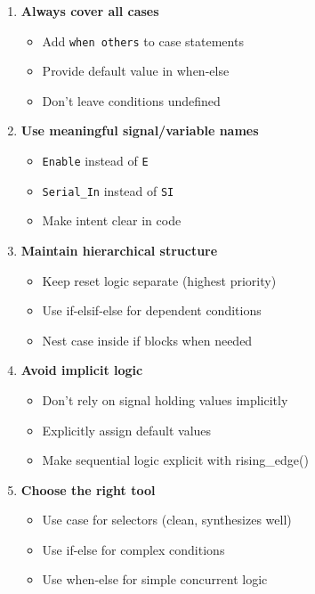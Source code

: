 \documentclass[12pt,a4paper]{article}
\begin{document}
\begin{enumerate}
    \item \textbf{Always cover all cases}
        \begin{itemize}
            \item Add \texttt{when others} to case statements
            \item Provide default value in when-else
            \item Don't leave conditions undefined
        \end{itemize}
    
    \item \textbf{Use meaningful signal/variable names}
        \begin{itemize}
            \item \texttt{Enable} instead of \texttt{E}
            \item \texttt{Serial\_In} instead of \texttt{SI}
            \item Make intent clear in code
        \end{itemize}
    
    \item \textbf{Maintain hierarchical structure}
        \begin{itemize}
            \item Keep reset logic separate (highest priority)
            \item Use if-elsif-else for dependent conditions
            \item Nest case inside if blocks when needed
        \end{itemize}
    
    \item \textbf{Avoid implicit logic}
        \begin{itemize}
            \item Don't rely on signal holding values implicitly
            \item Explicitly assign default values
            \item Make sequential logic explicit with rising\_edge()
        \end{itemize}
    
    \item \textbf{Choose the right tool}
        \begin{itemize}
            \item Use case for selectors (clean, synthesizes well)
            \item Use if-else for complex conditions
            \item Use when-else for simple concurrent logic
        \end{itemize}
\end{enumerate}
\end{document}
